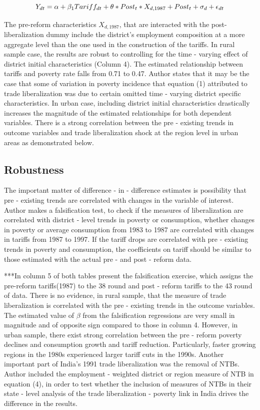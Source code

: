 \documentclass[a4paper,12pt]{article}
\begin{document}
\begin{equation}
\centering
Y_{dt} = \alpha + \beta_1 Tariff_{dt} + \theta * Post_t * X_{d,1987} + Post_t + \sigma_d + \epsilon_{dt}
\end{equation}



The pre-reform characteristics $X_{d,1987}$, that are interacted with the post-liberalization dummy include the district's employment composition at a more aggregate level than the one used in the construction of the tariffs. In rural sample case, the results are robust to controlling for the time - varying effect of district initial characteristics (Column 4). The estimated relationship between tariffs and poverty rate falls from 0.71 to 0.47. Author states that it may be the case that some of variation in poverty incidence that equation (1) attributed to trade liberalization was due to certain omitted time - varying district specific characteristics. In urban case, including district initial characteristics drastically increases the magnitude of the estimated relationships for both dependent variables. There is a strong correlation between the pre - existing trends in outcome variables and trade liberalization shock at the region level in urban areas as demonstrated below. 

\subsection{Robustness}

The important matter of difference - in - difference estimates is possibility that pre - existing trends are correlated with changes in the variable of interest. Author makes a falsification test, to check if the measures of liberalization are correlated with district - level trends in poverty or consumption, whether changes in poverty or average consumption from 1983 to 1987 are correlated with changes in tariffs from 1987 to 1997. If the tariff drops are correlated with pre - existing trends in poverty and consumption, the coefficients on tariff should be similar to those estimated with the actual pre - and post - reform data. 

***In column 5 of both tables present the falsification exercise, which assigns the pre-reform tariffs(1987) to the 38 round and post - reform tariffs to the 43 round of data. 
There is no evidence, in rural sample, that the measure of trade liberalization is correlated with the pre - existing trends in the outcome variables. The estimated value of $\beta$ from the falsification regressions are very small in magnitude and of opposite sign compared to those in column 4. However, in urban sample, there exist strong correlation between the pre - reform poverty declines and consumption growth and tariff reduction. Particularly, faster growing regions in the 1980s experienced larger tariff cuts in the 1990s. Another important part of India's 1991 trade liberalization was the removal of NTBs. Author included the employment - weighted district or region measure of NTB in equation (4), in order to test whether the inclusion of measures of NTBs in their state - level analysis of the trade liberalization - poverty link in India drives the difference in the results.   
\end{document}
